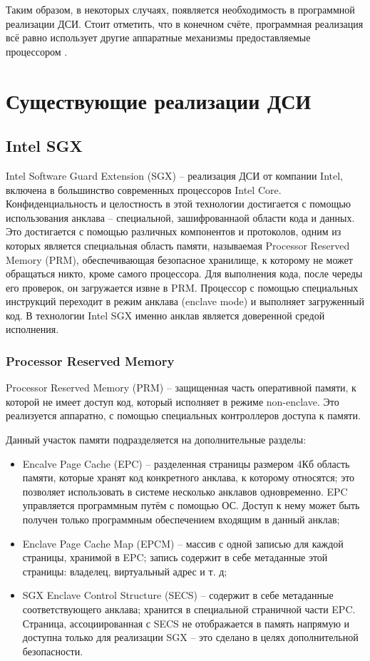 Таким образом, в некоторых случаях, появляется необходимость в программной реализации ДСИ. Стоит отметить, что в конечном счёте, программная реализация всё равно использует другие аппаратные механизмы предоставляемые процессором \cite{aaa}.
 
\section{Существующие реализации ДСИ}

\subsection{Intel SGX}

Intel Software Guard Extension (SGX) -- реализация ДСИ от компании Intel, включена в большинство современных процессоров Intel Core. Конфиденциальность и целостность в этой технологии достигается с помощью использования анклава -- специальной, зашифрованнаой области кода и данных. Это достигается с помощью различных компонентов и протоколов, одним из которых является специальная область памяти, называемая Processor Reserved Memory (PRM), обеспечивающая безопасное хранилище, к которому не может обращаться никто, кроме самого процессора. Для выполнения кода, после череды его проверок, он загружается извне в PRM. Процессор с помощью специальных инструкций переходит в режим анклава (enclave mode) и выполняет загруженный код. В технологии Intel SGX именно анклав является доверенной средой исполнения.

\subsubsection{Processor Reserved Memory}

Processor Reserved Memory (PRM) -- защищенная часть оперативной памяти, к которой не имеет доступ код, который исполняет в режиме non-enclave. Это реализуется аппаратно, с помощью специальных контроллеров доступа к памяти. 

Данный участок памяти подразделяется на дополнительные разделы:

\begin{itemize}
	\item Encalve Page Cache (EPC) -- разделенная страницы размером 4Кб область памяти, которые хранят код конкретного анклава, к которому относятся; это позволяет использовать в системе несколько анклавов одновременно. EPC управляется программным путём с помощью ОС. Доступ к нему может быть получен только программным обеспечением входящим в данный анклав;
	\item Enclave Page Cache Map (EPCM) -- массив с одной записью для каждой страницы, хранимой в EPC; запись содержит в себе метаданные этой страницы: владелец, виртуальный адрес и т. д;
	\item SGX Enclave Control Structure (SECS) -- содержит в себе метаданные соответствующего анклава; хранится в специальной страничной части EPC. Страница, ассоциированная с SECS не отображается в память напрямую и доступна только для реализации SGX -- это сделано в целях дополнительной безопасности.
\end{itemize}


